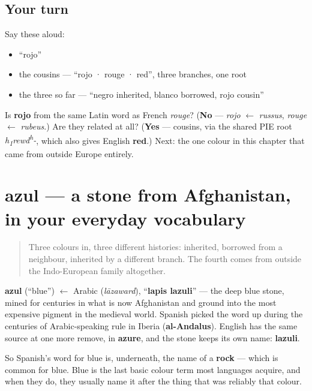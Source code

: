 \subsection*{Your turn}
Say these aloud:

\begin{itemize}
\raggedright
  \item \textquotedblleft{}rojo\textquotedblright{}
  \item the cousins — \textquotedblleft{}rojo · rouge · red\textquotedblright{}, three branches, one root
  \item the three so far — \textquotedblleft{}negro inherited, blanco borrowed, rojo cousin\textquotedblright{}
\end{itemize}

\begin{tcolorbox}[breakable,colback=teal!4,colframe=teal!35!black,title={Before you move on}]
Is \textbf{rojo} from the same Latin word as French \emph{rouge}? (\textbf{No} — \emph{rojo} $\leftarrow$ \emph{russus}, \emph{rouge} $\leftarrow$ \emph{rubeus}.) Are they related at all? (\textbf{Yes} — cousins, via the shared PIE root \emph{h\textsubscript{1}rewd\textsuperscript{h}-}, which also gives English \textbf{red}.) Next: the one colour in this chapter that came from outside Europe entirely.
\end{tcolorbox}
\section[azul]{azul — a stone from Afghanistan, in your everyday vocabulary}

\label{lesson:ES-C22-azul}



\begin{quote}
Three colours in, three different histories: inherited, borrowed from a neighbour, inherited by a different branch. The fourth comes from outside the Indo-European family altogether.
\end{quote}

\begin{cousinweb}
\textbf{azul} (\textquotedblleft{}blue\textquotedblright{}) $\leftarrow$ Arabic \textbf{} (\emph{lāzaward}), \textquotedblleft{}\textbf{lapis lazuli}\textquotedblright{} — the deep blue stone, mined for centuries in what is now Afghanistan and ground into the most expensive pigment in the medieval world. Spanish picked the word up during the centuries of Arabic-speaking rule in Iberia (\textbf{al-Andalus}). English has the same source at one more remove, in \textbf{azure}, and the stone keeps its own name: \textbf{lazuli}.

So Spanish's word for blue is, underneath, the name of a \textbf{rock} — which is common for blue. Blue is the last basic colour term most languages acquire, and when they do, they usually name it after the thing that was reliably that colour.
\end{cousinweb}

